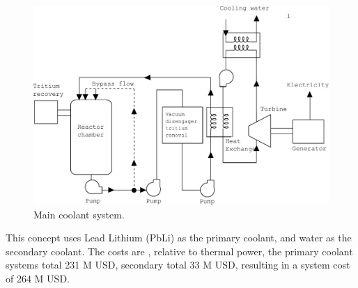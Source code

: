 \begin{figure}[h!]  
\centering  
\includegraphics[width=0.8\linewidth]{StandardFigures/steamPbLi-eps-converted-to.pdf}
\caption{Main coolant system.}
\label{fig:coola}
\end{figure} 

This concept uses Lead Lithium (PbLi) as the primary coolant, and water as the secondary coolant.  The costs are , relative to thermal power, the primary coolant systems total 231 M USD, secondary total 33 M USD, resulting in a system cost of 264 M USD. 